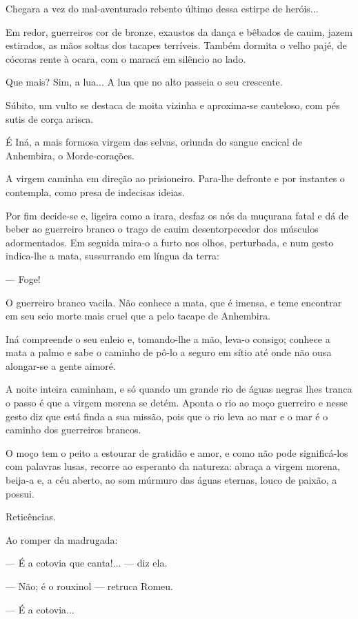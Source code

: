 Chegara a vez do mal-aventurado rebento último dessa estirpe de
heróis...

Em redor, guerreiros cor de bronze, exaustos da dança e bêbados de
cauim, jazem estirados, as mãos soltas dos tacapes terríveis. Também
dormita o velho pajé, de cócoras rente à ocara, com o maracá em silêncio
ao lado.

Que mais? Sim, a lua... A lua que no alto passeia o seu crescente.

Súbito, um vulto se destaca de moita vizinha e aproxima-se cauteloso,
com pés sutis de corça arisca.

É Iná, a mais formosa virgem das selvas, oriunda do sangue cacical de
Anhembira, o Morde-corações.

A virgem caminha em direção ao prisioneiro. Para-lhe defronte e por
instantes o contempla, como presa de indecisas ideias.

Por fim decide-se e, ligeira como a irara, desfaz os nós da muçurana
fatal e dá de beber ao guerreiro branco o trago de cauim desentorpecedor
dos músculos adormentados. Em seguida mira-o a furto nos olhos,
perturbada, e num gesto indica-lhe a mata, sussurrando em língua da
terra:

--- Foge!

O guerreiro branco vacila. Não conhece a mata, que é imensa, e teme
encontrar em seu seio morte mais cruel que a pelo tacape de Anhembira.

Iná compreende o seu enleio e, tomando-lhe a mão, leva-o consigo;
conhece a mata a palmo e sabe o caminho de pô-lo a seguro em sítio até
onde não ousa alongar-se a gente aimoré.

A noite inteira caminham, e só quando um grande rio de águas negras lhes
tranca o passo é que a virgem morena se detém. Aponta o rio ao moço
guerreiro e nesse gesto diz que está finda a sua missão, pois que o rio
leva ao mar e o mar é o caminho dos guerreiros brancos.

O moço tem o peito a estourar de gratidão e amor, e como não pode
significá-los com palavras lusas, recorre ao esperanto da natureza:
abraça a virgem morena, beija-a e, a céu aberto, ao som múrmuro das
águas eternas, louco de paixão, a possui.

Reticências.

Ao romper da madrugada:

--- É a cotovia que canta!... --- diz ela.

--- Não; é o rouxinol --- retruca Romeu.

--- É a cotovia...

